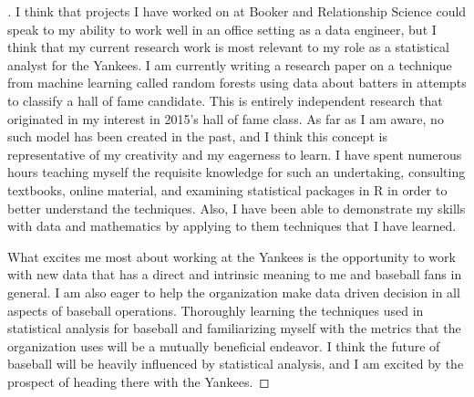 \documentclass[]{article}
\theoremstyle{definition}
\begin{document}
\begin{enumerate}
\begin{proof}[\unskip\nopunct]
	I think that projects I have worked on at Booker and Relationship Science could speak to my ability to work well in an office setting as a data engineer, but I think that my current research work is most relevant to my role as a statistical analyst for the Yankees. I am currently writing a research paper on a technique from machine learning called random forests using data about batters in attempts to classify a hall of fame candidate. This is entirely independent research that originated in my interest in 2015's hall of fame class. As far as I am aware, no such model has been created in the past, and I think this concept is representative of my creativity and my eagerness to learn. I have spent numerous hours teaching myself the requisite knowledge for such an undertaking, consulting textbooks, online material, and examining statistical packages in R in order to better understand the techniques. Also, I have been able to demonstrate my skills with data and mathematics by applying to them techniques that I have learned. 

	What excites me most about working at the Yankees is the opportunity to work with new data that has a direct and intrinsic meaning to me and baseball fans in general. I am also eager to help the organization make data driven decision in all aspects of baseball operations. Thoroughly learning the techniques used in statistical analysis for baseball and familiarizing myself with the metrics that the organization uses will be a mutually beneficial endeavor. I think the future of baseball will be heavily influenced by statistical analysis, and I am excited by the prospect of heading there with the Yankees.

\end{proof}

\end{enumerate}
\end{document}
